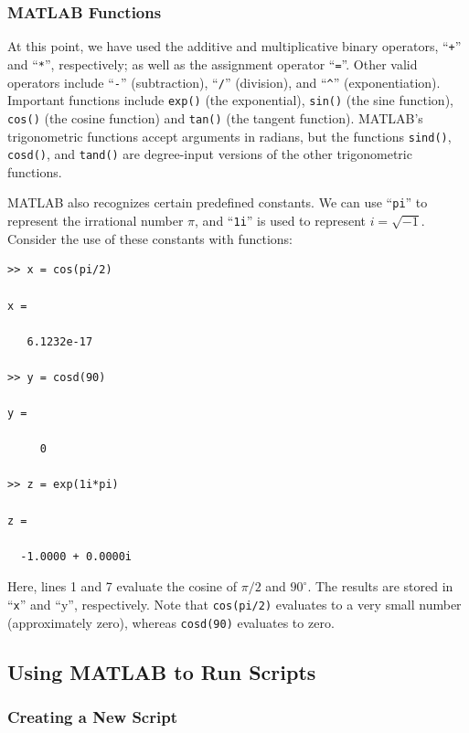 \subsubsection{MATLAB Functions}
At this point, we have used the additive and multiplicative binary operators, ``\verb!+!'' and ``\verb!*!'', respectively; as well as the assignment operator ``\verb!=!''. Other valid operators include ``\verb!-!'' (subtraction), ``\verb!/!'' (division), and ``\verb!^!'' (exponentiation). Important functions include \verb!exp()! (the exponential), \verb!sin()! (the sine function), \verb!cos()! (the cosine function) and \verb!tan()! (the tangent function). MATLAB's trigonometric functions accept arguments in radians, but the functions \verb!sind()!, \verb!cosd()!, and \verb!tand()! are degree-input versions of the other trigonometric functions.

MATLAB also recognizes certain predefined constants. We can use ``\texttt{pi}'' to represent the irrational number $\pi$, and ``\texttt{1i}'' is used to represent $i=\sqrt{-1}$. Consider the use of these constants with functions:
\begin{lstlisting}[style=Matlab-editor, label={MATLABCalculator05}, caption={Some examples of pre-defined constants in MATLAB.}]
>> x = cos(pi/2)

x =

   6.1232e-17

>> y = cosd(90)

y =

     0

>> z = exp(1i*pi)

z =

  -1.0000 + 0.0000i
\end{lstlisting}
Here, lines 1 and 7 evaluate the cosine of $\pi/2$ and $90^\circ$. The results are stored in ``\texttt{x}''  and ``y'', respectively. Note that \texttt{cos(pi/2)} evaluates to a very small number (approximately zero), whereas \texttt{cosd(90)} evaluates to zero.

\subsection{Using MATLAB to Run Scripts}

\subsubsection{Creating a New Script}

